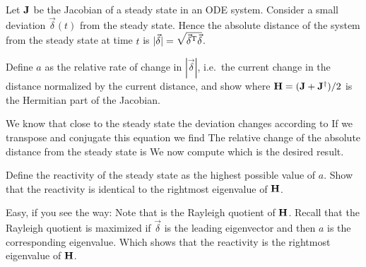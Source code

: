 Let $\bf J$ be the Jacobian of a steady state in an ODE system. Consider a small deviation $\vec{\delta}(t)$ from the steady state. Hence the absolute distance of the system from the steady state at time $t$ is $|\vec{\delta}|=\sqrt{\vec{\delta}^{\rm T}\vec{\delta}}$.

\subquestion
Define $a$ as the relative rate of change in $|\vec{\delta}|$, i.e.~the current change in the distance normalized by the current distance, and show 
where ${\bf H} = ({\bf J}+{\bf J}^{\dag})/2$ is the Hermitian part of the Jacobian. 

\solution 
We know that close to the steady state the deviation changes according to
If we transpose and conjugate this equation we find
The relative change of the absolute distance from the steady state is
We now compute
which is the desired result.

\subquestion Define the reactivity of the steady state as the highest possible value of $a$. Show that the reactivity is identical to the rightmost eigenvalue of $\bf H$. 

\solution
Easy, if you see the way: Note that 
is the Rayleigh quotient of $\bf H$. Recall that the Rayleigh quotient is maximized if $\vec{\delta}$ is the leading eigenvector and then $a$ is the corresponding eigenvalue. Which shows that the reactivity is the rightmost eigenvalue of $\bf H$.  

